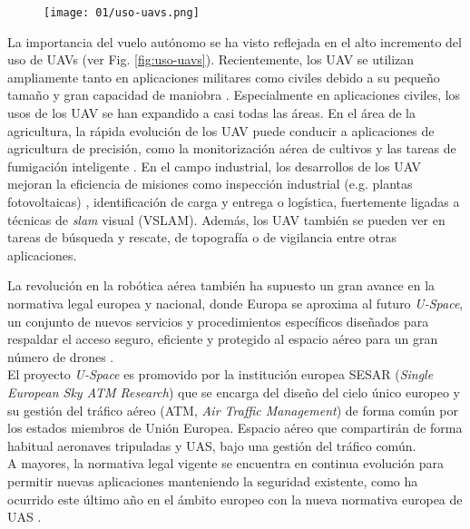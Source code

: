 \documentclass[../main.tex]{subfiles}
\begin{document}
\begin{figure}[ht]
 	{\texttt{[image: 01/uso-uavs.png]}}
\end{figure}

La importancia del vuelo autónomo se ha visto reflejada en el alto incremento del uso de UAVs (ver Fig. \ref{fig:uso-uavs}).
Recientemente, los UAV se utilizan ampliamente tanto en aplicaciones militares como civiles debido a su pequeño tamaño y gran capacidad de maniobra \cite{kim2019unmanned}. Especialmente en aplicaciones civiles, los usos de los UAV se han expandido a casi todas las áreas. En el área de la agricultura, la rápida evolución de los UAV puede conducir a aplicaciones de agricultura de precisión, como la monitorización aérea de cultivos y las tareas de fumigación inteligente \cite{radoglou2020compilation}. En el campo industrial, los desarrollos de los UAV mejoran la eficiencia de misiones como inspección industrial (e.g. plantas fotovoltaicas) \cite{yao2019unmanned}, identificación de carga y entrega o logística, fuertemente ligadas a técnicas de \emph{slam} visual (VSLAM). Además, los UAV también se pueden ver en tareas de búsqueda y rescate, de topografía o de vigilancia entre otras aplicaciones.

La revolución en la robótica aérea también ha supuesto un gran avance en la normativa legal europea y nacional, donde Europa se aproxima al futuro \emph{U-Space}, un conjunto de nuevos servicios y procedimientos específicos diseñados para respaldar el acceso seguro, eficiente y protegido al espacio aéreo para un gran número de drones \cite{u-space}. \\
El proyecto \emph{U-Space} es promovido por la institución europea SESAR (\emph{Single European Sky ATM Research}) que se encarga del diseño del cielo único europeo y su gestión del tráfico aéreo (ATM, \emph{Air Traffic Management}) de forma común por los estados miembros de Unión Europea. Espacio aéreo que compartirán de forma habitual aeronaves tripuladas y UAS, bajo una gestión del tráfico común. \\
A mayores, la normativa legal vigente se encuentra en continua evolución para permitir nuevas aplicaciones manteniendo la seguridad existente, como ha ocurrido este último año en el ámbito europeo con la nueva normativa europea de UAS \cite{normativa}.
\end{document}
